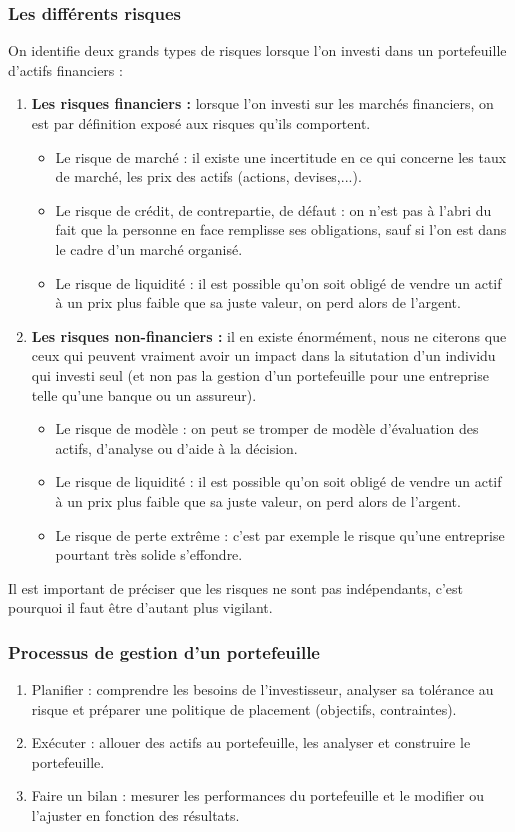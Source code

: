 \subsubsection{Les différents risques}
On identifie deux grands types de risques lorsque l'on investi dans un portefeuille d'actifs financiers :
\begin{enumerate}
 \item \textbf{Les risques financiers :} lorsque l'on investi sur les marchés financiers, on est par définition exposé aux risques qu'ils comportent.
    \begin{itemize}
     \item Le risque de marché : il existe une incertitude en ce qui concerne les taux de marché, les prix des actifs (actions, devises,...).
     \item Le risque de crédit, de contrepartie, de défaut : on n'est pas à l'abri du fait que la personne en face remplisse ses obligations, sauf si l'on est dans le cadre d'un marché organisé.
     \item Le risque de liquidité : il est possible qu'on soit obligé de vendre un actif à un prix plus faible que sa juste valeur, on perd alors de l'argent.
    \end{itemize}
 \item \textbf{Les risques non-financiers :} il en existe énormément, nous ne citerons que ceux qui peuvent vraiment avoir un impact dans la situtation d'un individu qui investi seul (et non pas la gestion d'un portefeuille pour une entreprise telle qu'une banque ou un assureur).
    \begin{itemize}
     \item Le risque de modèle : on peut se tromper de modèle d'évaluation des actifs, d'analyse ou d'aide à la décision.
     \item Le risque de liquidité : il est possible qu'on soit obligé de vendre un actif à un prix plus faible que sa juste valeur, on perd alors de l'argent.
     \item Le risque de perte extrême : c'est par exemple le risque qu'une entreprise pourtant très solide s'effondre.
    \end{itemize}
\end{enumerate}
Il est important de préciser que les risques ne sont pas indépendants, c'est pourquoi il faut être d'autant plus vigilant.

\subsubsection{Processus de gestion d'un portefeuille}
\begin{enumerate}
 \item Planifier : comprendre les besoins de l'investisseur, analyser sa tolérance au risque et préparer une politique de placement (objectifs, contraintes).
 \item Exécuter : allouer des actifs au portefeuille, les analyser et construire le portefeuille.
 \item Faire un bilan : mesurer les performances du portefeuille et le modifier ou l'ajuster en fonction des résultats.
\end{enumerate}

